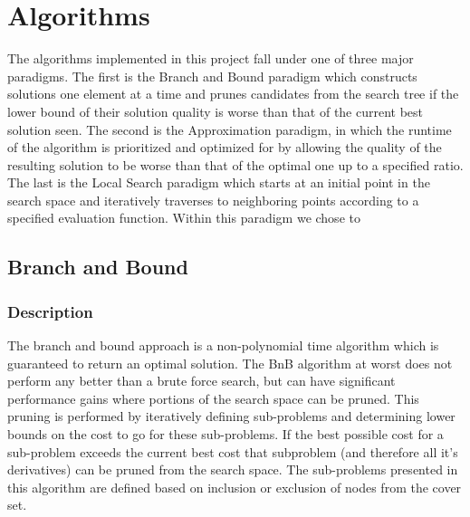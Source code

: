 \documentclass[acmlarge]{acmart}
\begin{document}
\section{Algorithms}


The algorithms implemented in this project fall under one of three major paradigms. The first is the Branch and Bound paradigm which constructs solutions one element at a time and prunes candidates from the search tree if the lower bound of their solution quality is worse than that of the current best solution seen. The second is the Approximation paradigm, in which the runtime of the algorithm is prioritized and optimized for by allowing the quality of the resulting solution to be worse than that of the optimal one up to a specified ratio. The last is the Local Search paradigm which starts at an initial point in the search space and iteratively traverses to neighboring points according to a specified evaluation function. Within this paradigm we chose to 

\subsection{Branch and Bound}

\subsubsection{Description}

The branch and bound approach is a non-polynomial time algorithm which is guaranteed to return an optimal solution. The BnB algorithm at worst does not perform any better than a brute force search, but can have significant performance gains where portions of the search space can be pruned. This pruning is performed by iteratively defining sub-problems and determining lower bounds on the cost to go for these sub-problems. If the best possible cost for a sub-problem exceeds the current best cost that subproblem (and therefore all it's derivatives) can be pruned from the search space. The sub-problems presented in this algorithm are defined based on inclusion or exclusion of nodes from the cover set. 
\end{document}
